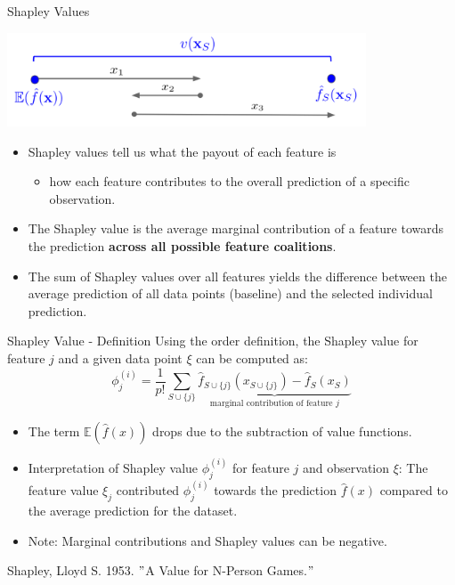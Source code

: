\documentclass[aspectratio=169]{../latex_main/tntbeamer}  %
\begin{document}
\begin{frame}{Shapley Values}

\begin{center}
\vspace{-0.3cm}
\includegraphics[width=0.8\textwidth]{figure/shapley_valuefct}
\end{center}

\begin{itemize}
     \item Shapley values tell us what the payout of each feature is
     \begin{itemize}
         \item how each feature contributes to the overall prediction of a specific observation.
     \end{itemize}
     \item The Shapley value is the average marginal contribution of a feature towards the prediction \textbf{across all possible feature coalitions}.
     \item The sum of Shapley values over all features yields the difference between the average prediction of all data points (baseline) and the selected individual prediction.
     \end{itemize}
\end{frame}

\begin{frame}{Shapley Value - Definition }
  Using the order definition, the Shapley value for feature $j$ and a given data point $\xi$ can be computed as:
     $$ \phi^{(i)}_j  = \frac{1}{p!} \sum_{S \cup \{j\}} \underbrace{\hat{f}_{S \cup \{j\}}(x_{S \cup \{j\}}) - \hat{f}_{S}(x_{S})}_{\text{marginal contribution of feature $j$}} $$
\begin{itemize}
    \item The term $\mathbb{E}(\hat{f}(x))$ drops due to the subtraction of value functions.
  \item Interpretation of Shapley value $\phi^{(i)}_j$ for feature $j$ and observation $\xi$:
  The feature value $\xi_{j}$ contributed $\phi^{(i)}_j$ towards the prediction $\hat{f}(x)$ compared to the average prediction for the dataset.
   \item Note: Marginal contributions and Shapley values can be negative.
\end{itemize}
\tiny
\vfill
Shapley, Lloyd S. 1953. $"$A Value for N-Person Games.$"$\\
\end{frame}
\end{document}
